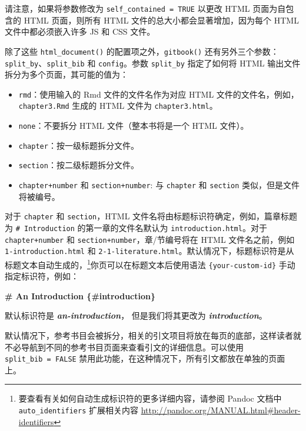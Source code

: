 \documentclass[
  12pt,
]{krantz}
\newenvironment{Shaded}{\begin{snugshade}}{\end{snugshade}}
\newcommand{\FunctionTok}[1]{\textcolor[rgb]{0.13,0.29,0.53}{\textbf{#1}}}
\newcommand{\InformationTok}[1]{\textcolor[rgb]{0.56,0.35,0.01}{\textbf{\textit{#1}}}}
\newcommand{\NormalTok}[1]{#1}
\providecommand{\tightlist}{%
  \setlength{\itemsep}{0pt}\setlength{\parskip}{0pt}}
\theoremstyle{definition}
\theoremstyle{definition}
\theoremstyle{definition}
\theoremstyle{definition}
\theoremstyle{remark}
\begin{document}
请注意，如果将参数修改为 \texttt{self\_contained\ =\ TRUE} 以更改 HTML 页面为自包含的 HTML 页面，则所有 HTML 文件的总大小都会显著增加，因为每个 HTML 文件中都必须嵌入许多 JS 和 CSS 文件。

除了这些 \texttt{html\_document()} 的配置项之外，\texttt{gitbook()} 还有另外三个参数：\texttt{split\_by}、\texttt{split\_bib} 和 \texttt{config}。参数 \texttt{split\_by} 指定了如何将 HTML 输出文件拆分为多个页面，其可能的值为：

\begin{itemize}
\tightlist
\item
  \texttt{rmd}：使用输入的 Rmd 文件的文件名作为对应 HTML 文件的文件名，例如，\texttt{chapter3.Rmd} 生成的 HTML 文件为 \texttt{chapter3.html}。
\item
  \texttt{none}：不要拆分 HTML 文件（整本书将是一个 HTML 文件）。
\item
  \texttt{chapter}：按一级标题拆分文件。
\item
  \texttt{section}：按二级标题拆分文件。
\item
  \texttt{chapter+number} 和 \texttt{section+number}: 与 \texttt{chapter} 和 \texttt{section} 类似，但是文件将被编号。
\end{itemize}

对于 \texttt{chapter} 和 \texttt{section}，HTML 文件名将由标题标识符确定，例如，篇章标题为 \texttt{\#\ Introduction} 的第一章的文件名默认为 \texttt{introduction.html}。对于 \texttt{chapter+number} 和 \texttt{section+number}，章/节编号将在 HTML 文件名之前，例如 \texttt{1-introduction.html} 和 \texttt{2-1-literature.html}。默认情况下，标题标识符是从标题文本自动生成的，\footnote{要查看有关如何自动生成标识符的更多详细内容，请参阅 Pandoc 文档中 \texttt{auto\_identifiers} 扩展相关内容 \url{http://pandoc.org/MANUAL.html\#header-identifiers}}你页可以在标题文本后使用语法 \texttt{\{your-custom-id\}} 手动指定标识符，例如：

\begin{Shaded}
\begin{Highlighting}[]
\FunctionTok{\# An Introduction \{\#introduction\}}

\NormalTok{默认标识符是 }\InformationTok{\textasciigrave{}an{-}introduction\textasciigrave{}}\NormalTok{，}
\NormalTok{但是我们将其更改为 }\InformationTok{\textasciigrave{}introduction\textasciigrave{}}\NormalTok{。}
\end{Highlighting}
\end{Shaded}

默认情况下，参考书目会被拆分，相关的引文项目将放在每页的底部，这样读者就不必导航到不同的参考书目页面来查看引文的详细信息。可以使用 \texttt{split\_bib\ =\ FALSE} 禁用此功能，在这种情况下，所有引文都放在单独的页面上。
\end{document}
